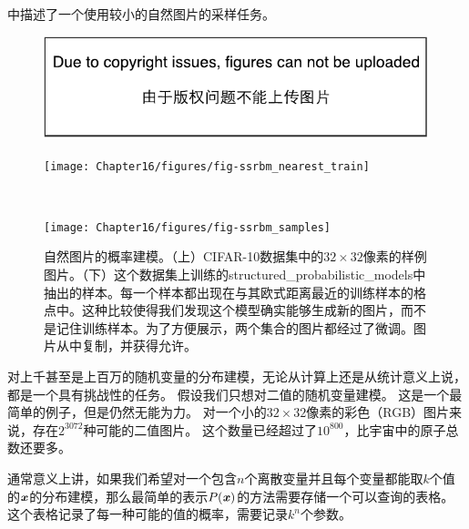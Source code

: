 中描述了一个使用较小的自然图片的采样任务。

\begin{figure}[!htb]
\ifOpenSource
\centerline{\includegraphics{figure.pdf}}
\else
	\centerline{\texttt{[image: Chapter16/figures/fig-ssrbm\_nearest\_train]}}\ \\
     \centerline{\texttt{[image: Chapter16/figures/fig-ssrbm\_samples]}}
\fi
	\caption{自然图片的概率建模。（上）CIFAR-10数据集\citep{KrizhevskyHinton2009}中的$32\times 32$像素的样例图片。（下）这个数据集上训练的\gls{structured_probabilistic_models}中抽出的样本。每一个样本都出现在与其欧式距离最近的训练样本的格点中。这种比较使得我们发现这个模型确实能够生成新的图片，而不是记住训练样本。为了方便展示，两个集合的图片都经过了微调。图片从\citet{Courville+al-2011-small}中复制，并获得允许。}
	\label{fig:chap16_fig-ssrbm}
\end{figure}

对上千甚至是上百万的随机变量的分布建模，无论从计算上还是从统计意义上说，都是一个具有挑战性的任务。
假设我们只想对二值的随机变量建模。
这是一个最简单的例子，但是仍然无能为力。
对一个小的$32\times 32$像素的彩色（RGB）图片来说，存在$2^{3072}$种可能的二值图片。
这个数量已经超过了$10^{800}$，比宇宙中的原子总数还要多。

通常意义上讲，如果我们希望对一个包含$n$个离散变量并且每个变量都能取$k$个值的$\boldsymbol{\mathit{x}}$的分布建模，那么最简单的表示$P(\boldsymbol{\mathit{x}})$的方法需要存储一个可以查询的表格。
这个表格记录了每一种可能的值的概率，需要记录$k^n$个参数。

